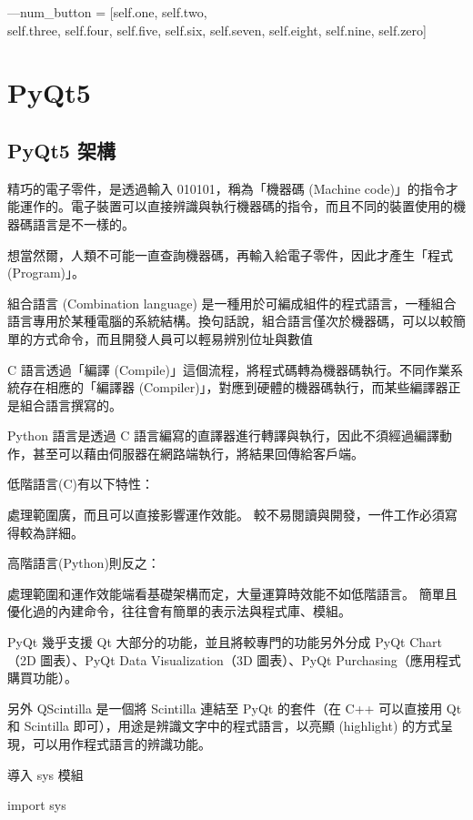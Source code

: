 \documentclass[12pt,,]{report}
\begin{document}
---num\_button = {[}self.one, self.two,\\
self.three, self.four, self.five, self.six, self.seven, self.eight,
self.nine, self.zero{]}

\hypertarget{pyqt5}{%
\chapter{PyQt5}\label{pyqt5}}

\hypertarget{pyqt5-ux67b6ux69cb}{%
\section{PyQt5 架構}\label{pyqt5-ux67b6ux69cb}}

精巧的電子零件，是透過輸入 010101，稱為「機器碼 (Machine
code)」的指令才能運作的。電子裝置可以直接辨識與執行機器碼的指令，而且不同的裝置使用的機器碼語言是不一樣的。

想當然爾，人類不可能一直查詢機器碼，再輸入給電子零件，因此才產生「程式
(Program)」。

組合語言 (Combination language)
是一種用於可編成組件的程式語言，一種組合語言專用於某種電腦的系統結構。換句話說，組合語言僅次於機器碼，可以以較簡單的方式命令，而且開發人員可以輕易辨別位址與數值

C 語言透過「編譯
(Compile)」這個流程，將程式碼轉為機器碼執行。不同作業系統存在相應的「編譯器
(Compiler)」，對應到硬體的機器碼執行，而某些編譯器正是組合語言撰寫的。

Python 語言是透過 C
語言編寫的直譯器進行轉譯與執行，因此不須經過編譯動作，甚至可以藉由伺服器在網路端執行，將結果回傳給客戶端。

低階語言(C)有以下特性：

處理範圍廣，而且可以直接影響運作效能。
較不易閱讀與開發，一件工作必須寫得較為詳細。

高階語言(Python)則反之：

處理範圍和運作效能端看基礎架構而定，大量運算時效能不如低階語言。
簡單且優化過的內建命令，往往會有簡單的表示法與程式庫、模組。

PyQt 幾乎支援 Qt 大部分的功能，並且將較專門的功能另外分成 PyQt Chart（2D
圖表）、PyQt Data Visualization（3D 圖表）、PyQt
Purchasing（應用程式購買功能）。

另外 QScintilla 是一個將 Scintilla 連結至 PyQt 的套件（在 C++ 可以直接用
Qt 和 Scintilla 即可），用途是辨識文字中的程式語言，以亮顯 (highlight)
的方式呈現，可以用作程式語言的辨識功能。

導入 sys 模組

import sys
\end{document}
